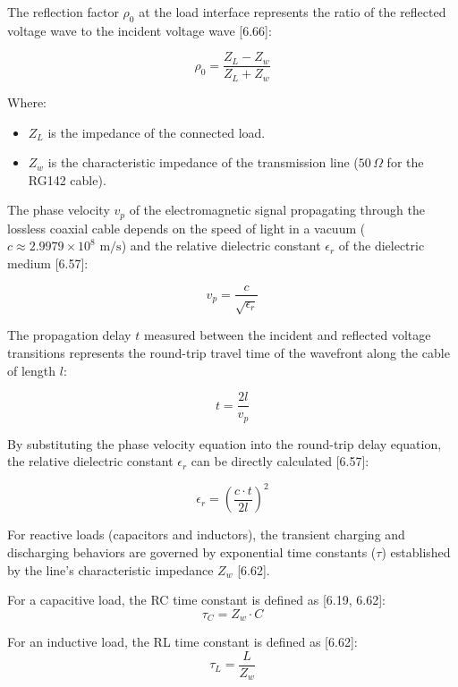 The reflection factor $\rho_0$ at the load interface represents the ratio of the reflected voltage wave to the incident voltage wave [6.66]:

\begin{equation}
    \rho_0 = \frac{Z_L - Z_w}{Z_L + Z_w}
\end{equation}

Where:
\begin{itemize}
    \item $Z_L$ is the impedance of the connected load.
    \item $Z_w$ is the characteristic impedance of the transmission line ($50\,\Omega$ for the RG142 cable).
\end{itemize}

The phase velocity $v_p$ of the electromagnetic signal propagating through the lossless coaxial cable depends on the speed of light in a vacuum ($c \approx 2.9979 \times 10^8\text{ m/s}$) and the relative dielectric constant $\epsilon_r$ of the dielectric medium [6.57]:

\begin{equation}
    v_p = \frac{c}{\sqrt{\epsilon_r}}
\end{equation}

The propagation delay $t$ measured between the incident and reflected voltage transitions represents the round-trip travel time of the wavefront along the cable of length $l$:

\begin{equation}
    t = \frac{2l}{v_p}
\end{equation}

By substituting the phase velocity equation into the round-trip delay equation, the relative dielectric constant $\epsilon_r$ can be directly calculated [6.57]:

\begin{equation}
    \epsilon_r = \left( \frac{c \cdot t}{2l} \right)^2
\end{equation}

For reactive loads (capacitors and inductors), the transient charging and discharging behaviors are governed by exponential time constants ($\tau$) established by the line's characteristic impedance $Z_w$ [6.62].

For a capacitive load, the RC time constant is defined as [6.19, 6.62]:
\begin{equation}
    \tau_C = Z_w \cdot C
\end{equation}

For an inductive load, the RL time constant is defined as [6.62]:
\begin{equation}
    \tau_L = \frac{L}{Z_w}
\end{equation}

